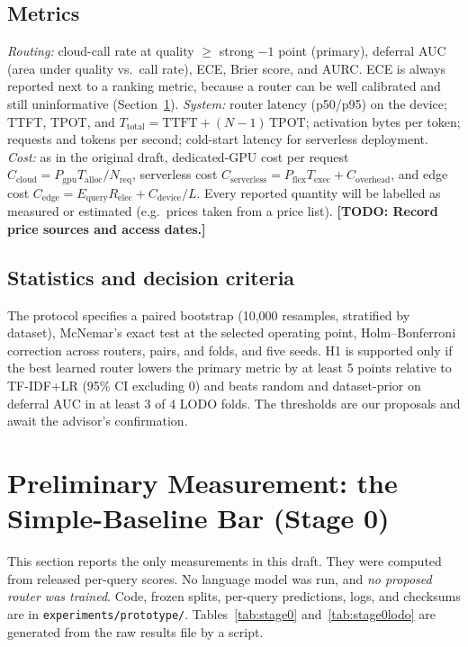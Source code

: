 \documentclass[lettersize,journal]{IEEEtran}
\newcommand{\todo}[1]{\textbf{[TODO: #1]}}
\begin{document}
\subsection{Metrics}
\label{sec:protocol:metrics}
\emph{Routing:} cloud-call rate at quality $\ge$ strong $-1$ point (primary),
deferral AUC (area under quality vs.\ call rate), ECE, Brier score, and AURC.
ECE is always reported next to a ranking metric, because a router can be
well calibrated and still uninformative (Section~\ref{sec:stage0}).
\emph{System:} router latency (p50/p95) on the device; TTFT, TPOT, and
$T_{\text{total}}=\text{TTFT}+(N-1)\,\text{TPOT}$; activation bytes per token;
requests and tokens per second; cold-start latency for serverless deployment.
\emph{Cost:} as in the original draft, dedicated-GPU cost per request
$C_{\text{cloud}}=P_{\text{gpu}}T_{\text{alloc}}/N_{\text{req}}$, serverless cost
$C_{\text{serverless}}=P_{\text{flex}}T_{\text{exec}}+C_{\text{overhead}}$, and edge
cost $C_{\text{edge}}=E_{\text{query}}R_{\text{elec}}+C_{\text{device}}/L$. Every
reported quantity will be labelled as measured or estimated (e.g.\ prices taken
from a price list). \todo{Record price sources and access dates.}

\subsection{Statistics and decision criteria}
The protocol specifies a paired bootstrap (10,000 resamples, stratified by
dataset), McNemar's exact test at the selected operating point,
Holm--Bonferroni correction across routers, pairs, and folds, and five seeds.
H1 is supported only if the best learned router lowers the primary metric by at
least 5 points relative to TF-IDF+LR (95\% CI excluding 0) and beats random and
dataset-prior on deferral AUC in at least 3 of 4 LODO folds. The thresholds are
our proposals and await the advisor's confirmation.

\section{Preliminary Measurement: the Simple-Baseline Bar (Stage 0)}
\label{sec:stage0}
This section reports the only measurements in this draft. They were computed
from released per-query scores. No language model was run, and \emph{no proposed
router was trained}. Code, frozen splits, per-query predictions, logs, and
checksums are in \texttt{experiments/prototype/}. Tables~\ref{tab:stage0}
and~\ref{tab:stage0lodo} are generated from the raw results file by a script.
\end{document}
